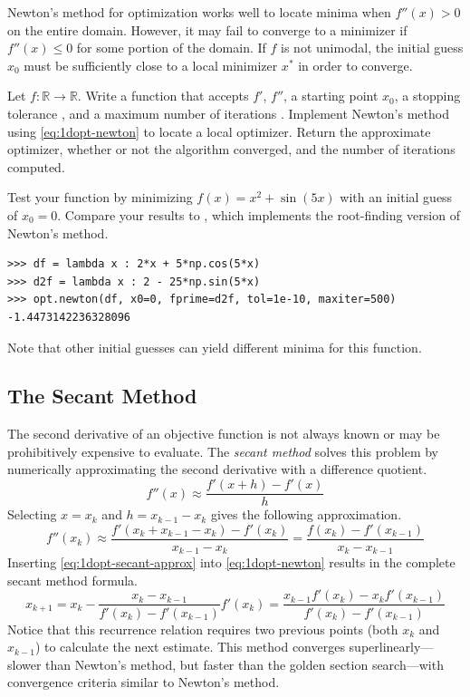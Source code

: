 Newton's method for optimization works well to locate minima when $f''(x) > 0$ on the entire domain.
However, it may fail to converge to a minimizer if $f''(x) \le 0$ for some portion of the domain.
If $f$ is not unimodal, the initial guess $x_0$ must be sufficiently close to a local minimizer $x^*$ in order to converge.

\begin{problem} %
Let $f:\mathbb{R}\rightarrow\mathbb{R}$.
Write a function that accepts $f'$, $f''$, a starting point $x_0$, a stopping tolerance , and a maximum number of iterations .
Implement Newton's method using \eqref{eq:1dopt-newton} to locate a local optimizer.
Return the approximate optimizer, whether or not the algorithm converged, and the number of iterations computed.

Test your function by minimizing $f(x) = x^2 + \sin(5x)$ with an initial guess of $x_0 = 0$.
Compare your results to , which implements the root-finding version of Newton's method.
\begin{lstlisting}
>>> df = lambda x : 2*x + 5*np.cos(5*x)
>>> d2f = lambda x : 2 - 25*np.sin(5*x)
>>> opt.newton(df, x0=0, fprime=d2f, tol=1e-10, maxiter=500)
-1.4473142236328096
\end{lstlisting}
Note that other initial guesses can yield different minima for this function.
\end{problem}

\subsection*{The Secant Method} %

The second derivative of an objective function is not always known or may be prohibitively expensive to evaluate.
The \emph{secant method} solves this problem by numerically approximating the second derivative with a difference quotient.
\[
f''(x) \approx \frac{f'(x + h) - f'(x)}{h}
\]
Selecting $x = x_k$ and $h = x_{k-1} - x_k$ gives the following approximation.
\begin{equation}
f''(x_k) \approx \frac{f'(x_k + x_{k-1} - x_k) - f'(x_k)}{x_{k-1} - x_k}
= \frac{f(x_k) - f'(x_{k-1})}{x_k - x_{k-1}}
\label{eq:1dopt-secant-approx}
\end{equation}
Inserting \eqref{eq:1dopt-secant-approx} into \eqref{eq:1dopt-newton} results in the complete secant method formula.
\begin{equation}
x_{k+1}
= x_k - \frac{x_k - x_{k-1}}{f'(x_k) - f'(x_{k-1})}f'(x_k)
= \frac{x_{k-1}f'(x_k) - x_{k}f'(x_{k-1})}{f'(x_k) - f'(x_{k-1})}
\label{eq:1dopt-secant-method}
\end{equation}
Notice that this recurrence relation requires two previous points (both $x_{k}$ and $x_{k-1}$) to calculate the next estimate.
This method converges superlinearly---slower than Newton's method, but faster than the golden section search---with convergence criteria similar to Newton's method.


